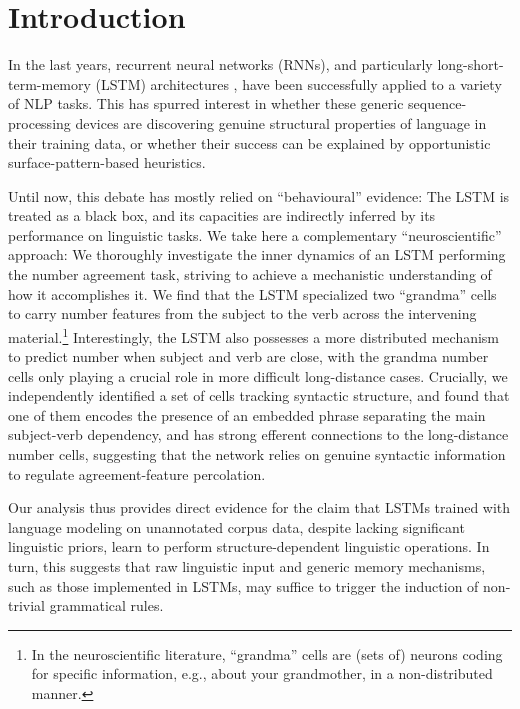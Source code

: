 \section{Introduction}

In the last years, recurrent neural networks (RNNs), and particularly
long-short-term-memory (LSTM) architectures
\cite{Hochreiter:Schmidhuber:1997}, have been successfully applied to
a variety of NLP tasks. This has spurred interest in whether these
generic sequence-processing devices are discovering genuine structural
properties of language in their training data, or whether their
success can be explained by opportunistic surface-pattern-based
heuristics.

Until now, this debate has mostly relied on ``behavioural'' evidence:
The LSTM is treated as a black box, and its capacities are indirectly
inferred by its performance on linguistic tasks. We take here a
complementary ``neuroscientific'' approach: We thoroughly investigate
the inner dynamics of an LSTM performing the number agreement task,
striving to achieve a mechanistic understanding of how it accomplishes
it. We find that the LSTM specialized two ``grandma'' cells
\cite{Bowers:2009} to carry number features from the subject to the
verb across the intervening material.\footnote{In the neuroscientific
  literature, ``grandma'' cells are (sets of) neurons coding for
  specific information, e.g., about your grandmother, in a
  non-distributed manner.} Interestingly, the LSTM also
possesses a more distributed mechanism to predict number when subject
and verb are close, with the grandma number cells only playing a
crucial role in more difficult long-distance cases. Crucially, we
independently identified a set of cells tracking syntactic structure,
and found that one of them encodes the presence of an embedded phrase
separating the main subject-verb dependency, and has strong efferent
connections to the long-distance number cells, suggesting that the
network relies on genuine syntactic information to regulate
agreement-feature percolation.

Our analysis thus provides direct evidence for the claim that LSTMs
trained with language modeling on unannotated corpus data, despite
lacking significant linguistic priors, learn to perform
structure-dependent linguistic operations. In turn, this suggests that
raw linguistic input and generic memory mechanisms, such as those
implemented in LSTMs, may suffice to trigger the induction of
non-trivial grammatical rules.



